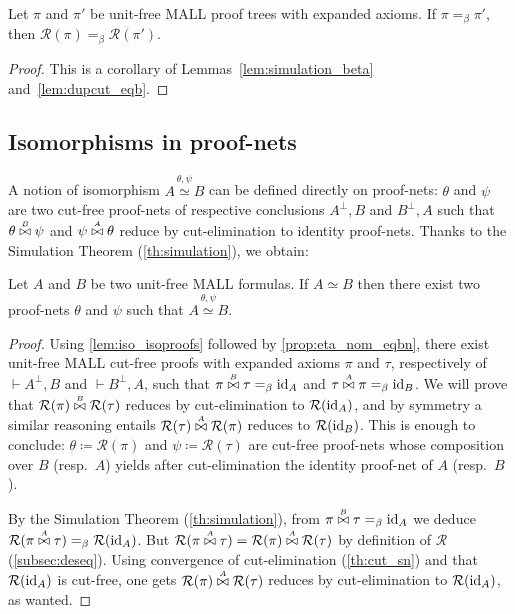 \documentclass{lmcs}
\newcommand*{\orth}{^\perp} %
\renewcommand*{\fCenter}{\vdash} %
\newcommand*{\resp}{resp.}
\newcommand*{\Rst}{\mathcal{R}} %
\newcommand*{\iso}{\mathrel{\simeq}} %
\newcommand*{\eqeq}{=} %
\newcommand{\symboltext}[2]{\mathrel{\overset{\makebox[0pt]{\mbox{\normalfont\tiny\sffamily \ensuremath{#1}}}}{#2}}} %
\newcommand{\eqb}{\mathrel{\eqeq_{\beta}}}
\newcommand*{\id}[1]{\ensuremath{\textnormal{id}_{#1}}}
\newcommand*{\cutf}[3]{\ensuremath{#1\symboltext{#3}{\bowtie} #2}}
\newcommand{\isoproofs}[4]{\overset{\ensuremath{#3,#4}}{#1\iso #2}}
\begin{document}
\begin{thm}
\label{th:simulation}
Let $\pi$ and $\pi'$ be unit-free MALL proof trees with expanded axioms.
If $\pi\eqb\pi'$, then $\Rst(\pi)\eqb\Rst(\pi')$.
\end{thm}
\begin{proof}
This is a corollary of Lemmas~\ref{lem:simulation_beta} and~\ref{lem:dupcut_eqb}.
\end{proof}

\subsection{Isomorphisms in proof-nets}
\label{subsec:iso_in_pn}

A notion of isomorphism $\isoproofs{A}{B}{\theta}{\psi}$ can be defined directly on proof-nets: $\theta$ and $\psi$ are two cut-free proof-nets of respective conclusions $A\orth,B$ and $B\orth,A$ such that $\cutf{\theta}{\psi}{B}$ and $\cutf{\psi}{\theta}{A}$ reduce by cut-elimination to identity proof-nets.
Thanks to the Simulation Theorem (\autoref{th:simulation}), we obtain:

\begin{thm}
\label{th:red_to_pn}
Let $A$ and $B$ be two unit-free MALL formulas.
If $A\iso B$ then there exist two proof-nets $\theta$ and $\psi$ such that $\isoproofs{A}{B}{\theta}{\psi}$.
\end{thm}
\begin{proof}
Using \autoref{lem:iso_isoproofs} followed by \autoref{prop:eta_nom_eqbn}, there exist unit-free MALL cut-free proofs with expanded axioms $\pi$ and $\tau$, respectively of $\fCenter A\orth,B$ and $\fCenter B\orth,A$, such that $\cutf{\pi}{\tau}{B}\eqb\id{A}$ and $\cutf{\tau}{\pi}{A}\eqb\id{B}$.
We will prove that $\cutf{\Rst(\pi)}{\Rst(\tau)}{B}$ reduces by cut-elimination to $\Rst(\id{A})$, and by symmetry a similar reasoning entails $\cutf{\Rst(\tau)}{\Rst(\pi)}{A}$ reduces to $\Rst(\id{B})$.
This is enough to conclude: $\theta \coloneqq \Rst(\pi)$ and $\psi \coloneqq \Rst(\tau)$ are cut-free proof-nets whose composition over $B$ (\resp\ $A$) yields after cut-elimination the identity proof-net of $A$ (\resp\ $B$).

By the Simulation Theorem (\autoref{th:simulation}), from $\cutf{\pi}{\tau}{B}\eqb\id{A}$ we deduce $\Rst(\cutf{\pi}{\tau}{A})\eqb\Rst(\id{A})$.
But $\Rst(\cutf{\pi}{\tau}{A})=\cutf{\Rst(\pi)}{\Rst(\tau)}{A}$ by definition of $\Rst$ (\autoref{subsec:deseq}).
Using convergence of cut-elimination (\autoref{th:cut_sn}) and that $\Rst(\id{A})$ is cut-free, one gets $\cutf{\Rst(\pi)}{\Rst(\tau)}{A}$ reduces by cut-elimination to $\Rst(\id{A})$, as wanted.
\end{proof}
\end{document}
